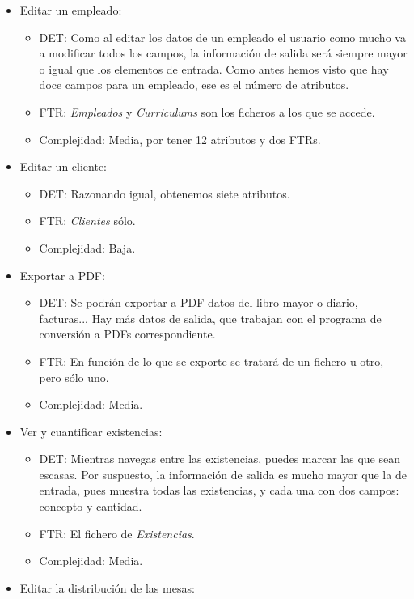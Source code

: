 \documentclass[spanish,a4paper,11pt, twoside]{report}	%
\begin{document}
	\begin{itemize}
		\item{Editar un empleado:} 
		\begin{itemize}
 			\item{DET:} Como al editar los datos de un empleado el usuario como mucho va a modificar todos los campos, la información de salida será siempre mayor o igual que los elementos de entrada. Como antes hemos visto que hay doce campos  para un empleado, ese es el número de atributos.
			\item{FTR:} \textit{Empleados} y \textit{Curriculums} son los ficheros a los que se accede.
			\item{Complejidad:} Media, por tener 12 atributos y dos FTRs.
		\end{itemize}
		\item{Editar un cliente:} 
		\begin{itemize}
 			\item{DET:} Razonando igual, obtenemos siete atributos.
			\item{FTR:} \textit{Clientes} sólo.
			\item{Complejidad:} Baja.
		\end{itemize}
		\item{Exportar a PDF:} 
		\begin{itemize}
 			\item{DET:} Se podrán exportar a PDF datos del libro mayor o diario, facturas... Hay más datos de salida, que trabajan con el programa de conversión a PDFs correspondiente.
			\item{FTR:} En función de lo que se exporte se tratará de un fichero u otro, pero sólo uno.
			\item{Complejidad:} Media.
		\end{itemize}
		\item{Ver y cuantificar existencias:} 
		\begin{itemize}
 			\item{DET:} Mientras navegas entre las existencias, puedes marcar las que sean escasas. Por suspuesto, la información de salida es mucho mayor que la de entrada, pues muestra todas las existencias, y cada una con dos campos: concepto y cantidad. 
			\item{FTR:} El fichero de \textit{Existencias}.
			\item{Complejidad:} Media.
		\end{itemize}
		\item{Editar la distribución de las mesas:} 
		\begin{itemize}

\end{itemize}
\end{itemize}
\end{document}
